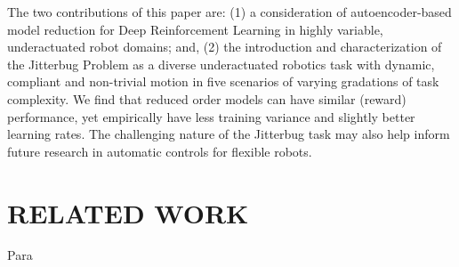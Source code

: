 \documentclass[letterpaper, 10 pt, conference]{ieeeconf}
\begin{document}
The two contributions of this paper are: (1) a consideration of autoencoder-based model reduction for Deep Reinforcement Learning in highly variable, underactuated robot domains; and, (2) the introduction and characterization of the Jitterbug Problem as a diverse underactuated robotics task with dynamic, compliant and non-trivial motion in five scenarios of varying gradations of task complexity.
We find that reduced order models can have similar (reward) performance, yet empirically have less training variance and slightly better learning rates.  
The challenging nature of the Jitterbug task may also help inform future research in automatic controls for flexible robots.

\section{RELATED WORK}





{Para}


















\end{document}
